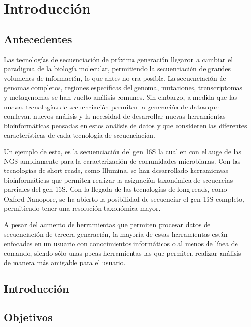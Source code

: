 \chapter{Introducción}

\section{Antecedentes}

Las tecnologías de secuenciación de próxima generación llegaron a cambiar el paradigma de la biología molecular, permitiendo la secuenciación de grandes volumenes de información, lo que antes no era posible.
La secuenciación de genomas completos, regiones específicas del genoma, mutaciones, transcriptomas y metagenomas se han vuelto análisis comunes. Sin embargo, a medida que las nuevas tecnologías de secuenciación permiten la generación de datos que conllevan nuevos análisis y la necesidad de desarrollar nuevas herramientas bioinformáticas pensadas en estos análisis de datos y que consideren las diferentes características de cada tecnología de secuenciación.

Un ejemplo de esto, es la secuenciación del gen 16S la cual en con el auge de las NGS ampliamente para la caracterización de comunidades microbianas. Con las tecnologías de short-reads, como Illumina, se han desarrollado herramientas bioinformáticas que permiten realizar la asignación taxonómica de secuencias parciales del gen 16S. Con la llegada de las tecnologías de long-reads, como Oxford Nanopore, se ha abierto la posibilidad de secuenciar el gen 16S completo, permitiendo tener una resolución taxonómica mayor. 

A pesar del aumento de herramientas que permiten procesar datos de secuenciación de tercera generación, la mayoría de estas herramientas están enfocadas en un usuario con conocimientos informáticos o al menos de línea de comando, siendo sólo unas pocas herramientas las que permiten realizar análisis de manera más amigable para el usuario.  
\section{Introducción}
\section{Objetivos}
